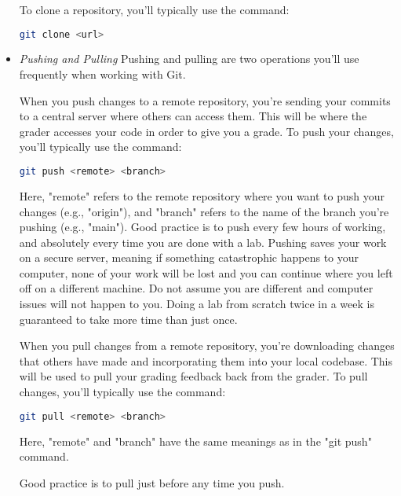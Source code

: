 \begin{itemize}
To clone a repository, you'll typically use the command:
\begin{lstlisting}[language=bash]
git clone <url>
\end{lstlisting}

\item \emph{Pushing and Pulling}
Pushing and pulling are two operations you'll use frequently when working with Git.

When you push changes to a remote repository, you're sending your commits to a central server where others can access them.
This will be where the grader accesses your code in order to give you a grade. 
To push your changes, you'll typically use the command:

\begin{lstlisting}[language=bash]
git push <remote> <branch>
\end{lstlisting}

Here, "remote" refers to the remote repository where you want to push your changes (e.g., "origin"), and "branch" refers to the name of the branch you're pushing (e.g., "main").
Good practice is to push every few hours of working, and absolutely every time you are done with a lab.
Pushing saves your work on a secure server, meaning if something catastrophic happens to your computer, none of your work will be lost and you can continue where you left off on a different machine.
Do not assume you are different and computer issues will not happen to you.
Doing a lab from scratch twice in a week is guaranteed to take more time than just once.

When you pull changes from a remote repository, you're downloading changes that others have made and incorporating them into your local codebase. 
This will be used to pull your grading feedback back from the grader.
To pull changes, you'll typically use the command:

\begin{lstlisting}[language=bash]
git pull <remote> <branch>
\end{lstlisting}

Here, "remote" and "branch" have the same meanings as in the "git push" command.

Good practice is to pull just before any time you push. 


\end{itemize}
